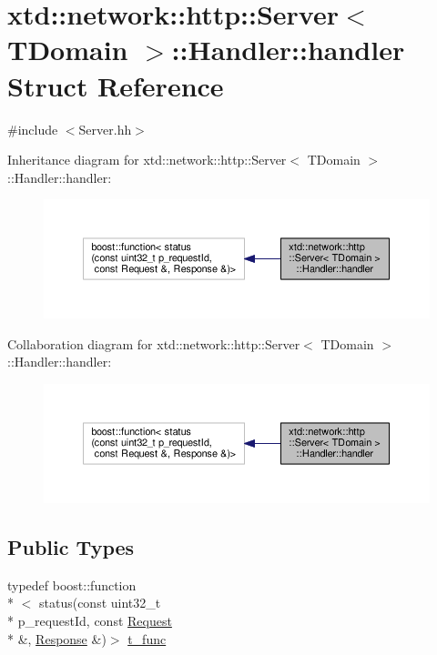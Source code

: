 \hypertarget{structxtd_1_1network_1_1http_1_1Server_1_1Handler_1_1handler}{\section{xtd\-:\-:network\-:\-:http\-:\-:Server$<$ T\-Domain $>$\-:\-:Handler\-:\-:handler Struct Reference}
\label{structxtd_1_1network_1_1http_1_1Server_1_1Handler_1_1handler}
}


{\ttfamily \#include $<$Server.\-hh$>$}



Inheritance diagram for xtd\-:\-:network\-:\-:http\-:\-:Server$<$ T\-Domain $>$\-:\-:Handler\-:\-:handler\-:
\nopagebreak
\begin{figure}[H]
\begin{center}
\leavevmode
\includegraphics[width=350pt]{structxtd_1_1network_1_1http_1_1Server_1_1Handler_1_1handler__inherit__graph}
\end{center}
\end{figure}


Collaboration diagram for xtd\-:\-:network\-:\-:http\-:\-:Server$<$ T\-Domain $>$\-:\-:Handler\-:\-:handler\-:
\nopagebreak
\begin{figure}[H]
\begin{center}
\leavevmode
\includegraphics[width=350pt]{structxtd_1_1network_1_1http_1_1Server_1_1Handler_1_1handler__coll__graph}
\end{center}
\end{figure}
\subsection*{Public Types}
\begin{DoxyCompactItemize}
\item 
typedef boost\-::function\\*
$<$ status(const uint32\-\_\-t \\*
p\-\_\-request\-Id, const \hyperlink{classxtd_1_1network_1_1http_1_1Request}{Request} \\*
\&, \hyperlink{classxtd_1_1network_1_1http_1_1Response}{Response} \&)$>$ \hyperlink{structxtd_1_1network_1_1http_1_1Server_1_1Handler_1_1handler_abc77960df1a1b3015dfe9e1038efabba}{t\-\_\-func}
\end{DoxyCompactItemize}
